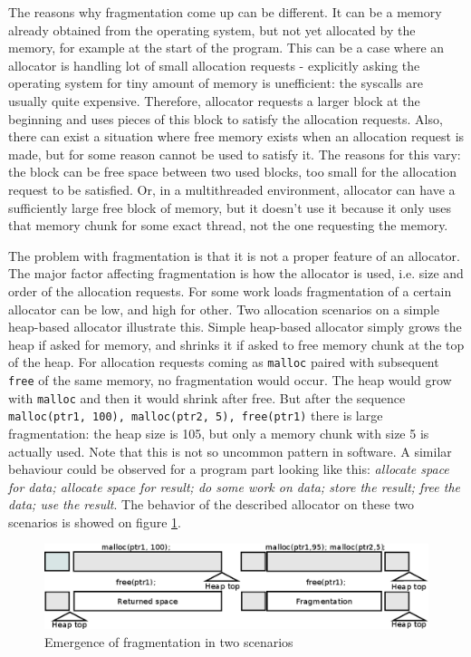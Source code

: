 The reasons why fragmentation come up can be different. It can be a memory already obtained from the operating system, but not yet allocated by the memory, for example at the start of the program. This can be a case where an allocator is handling lot of small allocation requests - explicitly asking the operating system for tiny amount of memory is unefficient: the syscalls are usually quite expensive. Therefore, allocator requests a larger block at the beginning and uses pieces of this block to satisfy the allocation requests. Also, there can exist a situation where free memory exists when an allocation request is made, but for some reason cannot be used to satisfy it. The reasons for this vary: the block can be free space between two used blocks, too small for the allocation request to be satisfied. Or, in a multithreaded environment, allocator can have a sufficiently large free block of memory, but it doesn't use it because it only uses that memory chunk for some exact thread, not the one requesting the memory.

The problem with fragmentation is that it is not a proper feature of an allocator. The major factor affecting fragmentation is how the allocator is used, i.e. size and order of the allocation requests. For some work loads fragmentation of a certain allocator can be low, and high for other. Two allocation scenarios on a simple heap-based allocator illustrate this. Simple heap-based allocator simply grows the heap if asked for memory, and shrinks it if asked to free memory chunk at the top of the heap. For allocation requests coming as {\tt malloc} paired with subsequent {\tt free} of the same memory, no fragmentation would occur. The heap would grow with {\tt malloc} and then it would shrink after free. But after the sequence {\tt malloc(ptr1, 100), malloc(ptr2, 5), free(ptr1)} there is large fragmentation: the heap size is 105, but only a memory chunk with size 5 is actually used. Note that this is not so uncommon pattern in software. A similar behaviour could be observed for a program part looking like this: {\em allocate space for data; allocate space for result; do some work on data; store the result; free the data; use the result}. The behavior of the described allocator on these two scenarios is showed on figure \ref{fig:fragmentation}.

\begin{figure}[h]
\begin{center}
\includegraphics[keepaspectratio,width=1.0\textwidth]{fig/fragmentation}
\end{center}
\caption{Emergence of fragmentation in two scenarios}
\label{fig:fragmentation}
\end{figure}

